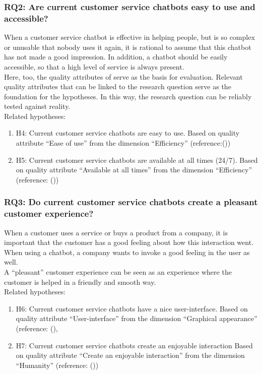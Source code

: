 \subsubsection{RQ2: Are current customer service chatbots easy to use and accessible?}
When a customer service chatbot is effective in helping people, but is so complex or unusable that nobody uses it again, it is rational to assume that this chatbot has not made a good impression. In addition, a chatbot should be easily accessible, so that a high level of service is always present.\\
Here, too, the quality attributes of \cite{Verkeyn2018} serve as the basis for evaluation. Relevant quality attributes that can be linked to the research question serve as the foundation for the hypotheses. In this way, the research question can be reliably tested against reality.\\
\break
\break
Related hypotheses:
\begin{enumerate}
	\item H4: Current customer service chatbots are easy to use. Based on \cite{Verkeyn2018} quality attribute “Ease of use” from the dimension “Efficiency” (reference:(\cite{Candela2018, Duijst2017}))
	\item H5: Current customer service chatbots are available at all times (24/7). Based on \cite{Verkeyn2018} quality attribute “Available at all times” from the dimension “Efficiency” (reference: (\cite{Wang2019}))
\end{enumerate}

\subsubsection{RQ3: Do current customer service chatbots create a pleasant customer experience?}
When a customer uses a service or buys a product from a company, it is important that the customer has a good feeling about how this interaction went. When using a chatbot, a company wants to invoke a good feeling in the user as well. \\
\break
A “pleasant” customer experience can be seen as an experience where the customer is helped in a friendly and smooth way.\\
\break
\break
Related hypotheses:
\begin{enumerate}
	\item H6: Current customer service chatbots have a nice user-interface. Based on \cite{Verkeyn2018} quality attribute “User-interface” from the dimension “Graphical appearance” (reference: (\cite{Duijst2017, Kuligowska2015}),
	\item H7: Current customer service chatbots create an enjoyable interaction Based on \cite{Verkeyn2018} quality attribute “Create an enjoyable interaction” from the dimension “Humanity” (reference: (\cite{Morrissey2013}))
\end{enumerate}

